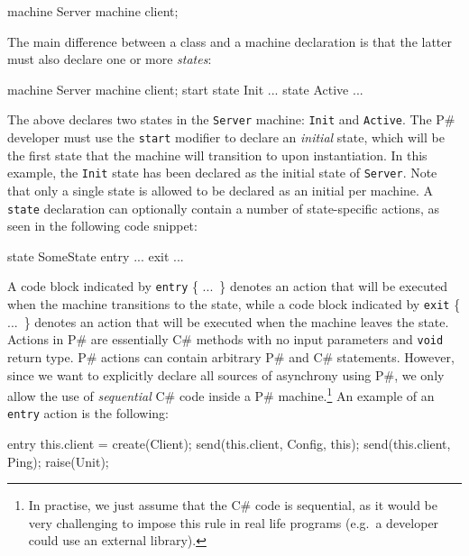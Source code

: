 \documentclass{llncs}
\newcommand{\ps}{P\#\xspace}
\newcommand{\cs}{C\#\xspace}
\begin{document}
\begin{psharpNoLines}
machine Server {
  machine client;
}
\end{psharpNoLines}

\noindent
The main difference between a class and a machine declaration is that the latter must also declare one or more \emph{states}:

\begin{psharpNoLines}
machine Server {
  machine client;
  start state Init { ... }
  state Active { ... }
}
\end{psharpNoLines}

\noindent
The above declares two states in the \texttt{Server} machine: \texttt{Init} and \texttt{Active}. The \ps developer must use the \texttt{start} modifier to declare an \emph{initial} state, which will be the first state that the machine will transition to upon instantiation. In this example, the \texttt{Init} state has been declared as the initial state of \texttt{Server}. Note that only a single state is allowed to be declared as an initial per machine. A \texttt{state} declaration can optionally contain a number of state-specific actions, as seen in the following code snippet:

\begin{psharpNoLines}
state SomeState {
  entry { ... }
  exit { ... }
}
\end{psharpNoLines}

\noindent
A code block indicated by \texttt{entry} \{ ...\ \} denotes an action that will be executed when the machine transitions to the state, while a code block indicated by \texttt{exit} \{ ...\ \} denotes an action that will be executed when the machine leaves the state. Actions in \ps are essentially \cs methods with no input parameters and \texttt{void} return type. \ps actions can contain arbitrary \ps and \cs statements. However, since we want to explicitly declare all sources of asynchrony using \ps, we only allow the use of \emph{sequential} \cs code inside a \ps machine.\footnote{In practise, we just assume that the \cs code is sequential, as it would be very challenging to impose this rule in real life programs (e.g.\ a developer could use an external library).} An example of an \texttt{entry} action is the following:

\begin{psharpNoLines}
entry {
  this.client = create(Client);
  send(this.client, Config, this);
  send(this.client, Ping);
  raise(Unit);
}
\end{psharpNoLines}
\end{document}
